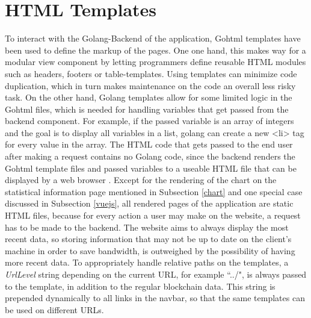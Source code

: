 \section{HTML Templates}
To interact with the Golang-Backend of the application, Gohtml templates \cite{template} have been used to define the markup of the pages. One one hand, this makes way for a modular view component by letting programmers define reusable HTML modules such as headers, footers or table-templates. Using templates can minimize code duplication, which in turn makes maintenance on the code an overall less risky task. On the other hand, Golang templates allow for some limited logic in the Gohtml files, which is needed for handling variables that get passed from the backend component. For example, if the passed variable is an array of integers and the goal is to display all variables in a list, golang can create a new <li> tag for every value in the array. The HTML code that gets passed to the end user after making a request contains no Golang code, since the backend renders the Gohtml template files and passed variables to a useable HTML file that can be displayed by a web browser \cite{httppackage}. Except for the rendering of the chart on the statistical information page mentioned in Subsection \ref{chart} and one special case discussed in Subsection \ref{vuejs}, all rendered pages of the application are static HTML files, because for every action a user may make on the website, a request has to be made to the backend. The website aims to always display the most recent data, so storing information that may not be up to date on the client's machine in order to save bandwidth, is outweighed by the possibility of having more recent data. To appropriately handle relative paths on the templates, a \emph{UrlLevel} string depending on the current URL, for example ``../", is always passed to the template, in addition to the regular blockchain data. This string is prepended dynamically to all links in the navbar, so that the same templates can be used on different URLs.

